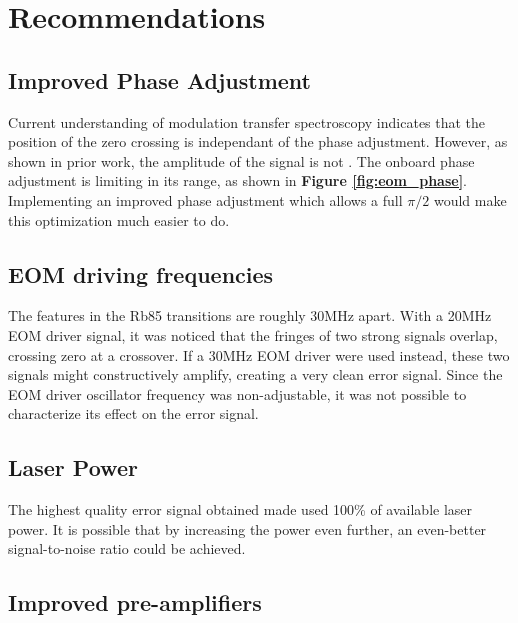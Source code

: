\newpage

\section{Recommendations}
\label{sec:recommendations}

\subsection{Improved Phase Adjustment}

Current understanding of modulation transfer spectroscopy indicates that the position of the zero crossing is independant of the phase adjustment.  However, as shown in prior work, the amplitude of the signal is not \cite{0957-0233-19-10-105601}. The onboard phase adjustment is limiting in its range, as shown in \textbf{Figure \ref{fig:eom_phase}}.  Implementing an improved phase adjustment which allows a full $\pi/2$ would make this optimization much easier to do.

\subsection{EOM driving frequencies}

The features in the Rb85 transitions are roughly 30MHz apart.  With a 20MHz EOM driver signal, it was noticed that the fringes of two strong signals overlap, crossing zero at a crossover.  If a 30MHz EOM driver were used instead, these two signals might constructively amplify, creating a very clean error signal. Since the EOM driver oscillator frequency was non-adjustable, it was not possible to characterize its effect on the error signal.

\subsection{Laser Power}

The highest quality error signal obtained made used 100\% of available laser power.  It is possible that by increasing the power even further, an even-better signal-to-noise ratio could be achieved.

\subsection{Improved pre-amplifiers}

